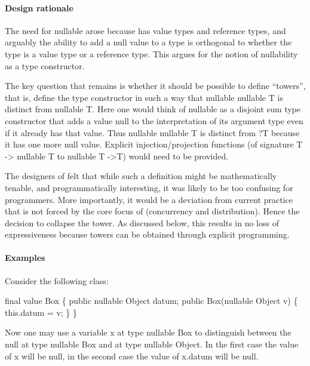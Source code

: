 \paragraph{Design rationale}

The need for {\cf nullable} arose because \Xten{} has value types and
reference types, and arguably the ability to add a {\cf null} value to
a type is orthogonal to whether the type is a value type or a
reference type. This argues for the notion of nullability as a type
constructor.

The key question that remains is whether it should be possible to
define ``towers'', that is, define the type constructor in such a way
that {\cf nullable nullable T} is distinct from {\cf nullable T}. Here
one would think of nullable as a disjoint sum type constructor that
adds a value {\cf null} to the interpretation of its argument type
even if it already has that value. Thus {\cf nullable nullable T} is
distinct from {\cf ?T} because it has one more {\cf null}
value. Explicit injection/projection functions (of signature {\cf T ->
nullable T} to {\cf nullable T ->T}) would need to be provided.

The designers of \Xten{} felt that while such a definition might be
mathematically tenable, and programmatically interesting, it was
likely to be too confusing for programmers. More importantly, it would
be a deviation from current practice that is not forced by the core
focus of \Xten{} (concurrency and distribution). Hence the decision to
collapse the tower.  As discussed below, this results in no loss of
expressiveness because towers can be obtained through explicit
programming.

\paragraph{Examples}

Consider the following class:

\begin{x10}
 final value Box \{ 
   public nullable Object datum; 
   public Box(nullable Object v) \{ this.datum = v; \}
  \}
\end{x10}

Now one may use a variable {\cf x} at type {\cf nullable Box} to
distinguish between the {\cf null} at type {\cf nullable Box} and at type
{\cf nullable Object}. In the first case the value
of {\cf x} will be {\cf null}, in the second case the value of {\cf x.datum} will
be {\cf null}.

